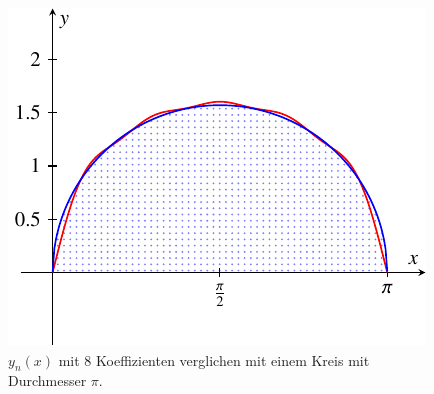 \begin{figure}
	\centering
	\includegraphics{papers/antennen/images/koeffVergleichKreis.pdf}
	\caption{$y_n(x)$ mit 8 Koeffizienten verglichen mit einem Kreis mit Durchmesser $\pi$.}
	\label{antennen:vergleichKreis}
\end{figure}
